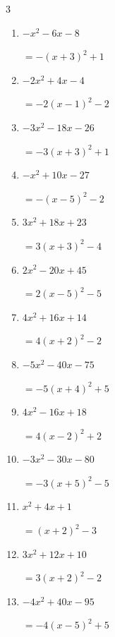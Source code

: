 \begin{multicols}{3}
\begin{enumerate}
        $=-4\left( x+5\right)^{2}$

  \item $-x^{2}-6x-8$

        $=-\left( x+3\right)^{2}+1$

  \item $-2x^{2}+4x-4$

        $=-2\left( x-1\right)^{2}-2$

\columnbreak %

  \item $-3x^{2}-18x-26$

        $=-3\left( x+3\right)^{2}+1$

  \item $-x^{2}+10x-27$

        $=-\left( x-5\right)^{2}-2$

  \item $3x^{2}+18x+23$

        $=3\left( x+3\right)^{2}-4$

  \item $2x^{2}-20x+45$

        $=2\left( x-5\right)^{2}-5$

  \item $4x^{2}+16x+14$

        $=4\left( x+2\right)^{2}-2$

  \item $-5x^{2}-40x-75$

        $=-5\left( x+4\right)^{2}+5$

  \item $4x^{2}-16x+18$

        $=4\left( x-2\right)^{2}+2$

  \item $-3x^{2}-30x-80$

        $=-3\left( x+5\right)^{2}-5$

  \item $x^{2}+4x+1$

        $=\left( x+2\right)^{2}-3$

  \item $3x^{2}+12x+10$

        $=3\left( x+2\right)^{2}-2$

\columnbreak %

\resetques

  \item $-4x^{2}+40x-95$

        $=-4\left( x-5\right)^{2}+5$


\end{enumerate}
\end{multicols}
